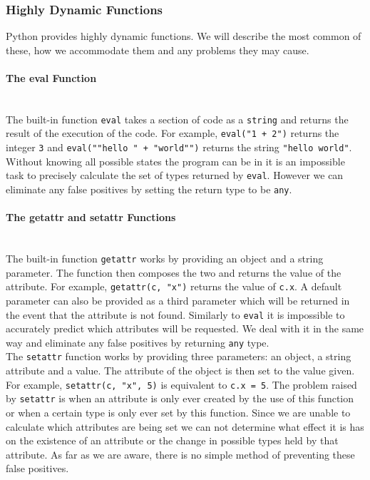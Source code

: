 \documentclass[12pt, titlepage]{article}
\begin{document}
\subsubsection{Highly Dynamic Functions}
\label{chap:highlyDynamic}
Python provides highly dynamic functions. We will describe the most common of these, how we accommodate them and any problems they may cause. 
\paragraph*{The eval Function}\mbox{} \\
The built-in function \texttt{eval} takes a section of code as a \texttt{string} and returns the result of the execution of the code. For example, \texttt{eval("1 + 2")} returns the integer \texttt{3} and  \texttt{eval(""hello " + "world"")} returns the string \texttt{"hello world"}. Without knowing all possible states the program can be in it is an impossible task to precisely calculate the set of types returned by \texttt{eval}. However we can eliminate any false positives by setting the return type to be \texttt{any}.

\paragraph*{The getattr and setattr Functions}\mbox{} \\
The built-in function \texttt{getattr} works by providing an object and a string parameter. The function then composes the two and returns the value of the attribute. For example, \texttt{getattr(c, "x")} returns the value of \texttt{c.x}. A default parameter can also be provided as a third parameter which will be returned in the event that the attribute is not found. Similarly to \texttt{eval} it is impossible to accurately predict which attributes will be requested. We deal with it in the same way and eliminate any false positives by returning \texttt{any} type. \\
\indent The \texttt{setattr} function works by providing three parameters: an object, a string attribute and a value. The attribute of the object is then set to the value given. For example, \texttt{setattr(c, "x", 5)} is equivalent to \texttt{c.x = 5}. The problem raised by \texttt{setattr} is when an attribute is only ever created by the use of this function or when a certain type is only ever set by this function. Since we are unable to calculate which attributes are being set we can not determine what effect it is has on the existence of an attribute or the change in possible types held by that attribute. As far as we are aware, there is no simple method of preventing these false positives.
\end{document}
